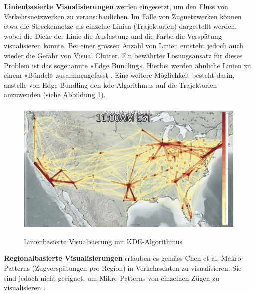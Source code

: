 \textbf{Linienbasierte Visualisierungen} werden eingesetzt, um den Fluss von Verkehrsnetzwerken zu veranschaulichen. Im Falle von Zugnetzwerken können etwa die Streckennetze als einzelne Linien (Trajektorien) dargestellt werden, wobei die Dicke der Linie die Auslastung und die Farbe die Verspätung visualisieren könnte. Bei einer grossen Anzahl von Linien entsteht jedoch auch wieder die Gefahr von Visual Clutter. Ein bewährter Lösungsansatz für dieses Problem ist das sogenannte «Edge Bundling». Hierbei werden ähnliche Linien zu einem «Bündel» zusammengefasst \parencite[S. 2974 - 2976]{survey_traffic_data_visualization_2015}. Eine weitere Möglichkeit besteht darin, anstelle von Edge Bundling den \acrshort{kde} Algorithmus auf die Trajektorien anzuwenden (siehe Abbildung \ref{fig_line_kde}).

\begin{figure}[H]
    \caption{Linienbasierte Visualisierung mit KDE-Algorithmus \parencite[S. 7]{streaming_data_kde}}
    \includegraphics[width=.5\linewidth]{content/00_assets/line_visualization_kde.png}
    \label{fig_line_kde}
\end{figure}

\textbf{Regionalbasierte Visualisierungen} erlauben es gemäss Chen et al. Makro-Patterns (Zugverspätungen pro Region) in Verkehrsdaten zu visualisieren. Sie sind jedoch nicht geeignet, um Mikro-Patterns von einzelnen Zügen zu visualisieren \parencite[S. 2976]{survey_traffic_data_visualization_2015}.

